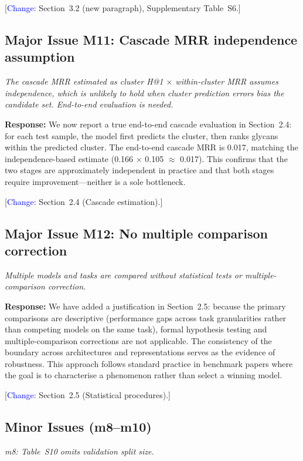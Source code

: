 \documentclass[11pt,a4paper]{article}
\newcommand{\reviewercomment}[1]{\textit{\color{black!70}#1}}
\newcommand{\response}[1]{\textbf{Response:} #1}
\newcommand{\change}[1]{[\textcolor{blue}{Change:} #1]}
\begin{document}
\change{Section~3.2 (new paragraph), Supplementary Table~S6.}

\subsection*{Major Issue M11: Cascade MRR independence assumption}

\reviewercomment{The cascade MRR estimated as cluster H@1 $\times$
within-cluster MRR assumes independence, which is unlikely to hold when cluster
prediction errors bias the candidate set. End-to-end evaluation is needed.}

\response{We now report a true end-to-end cascade evaluation in Section~2.4:
for each test sample, the model first predicts the cluster, then ranks glycans
within the predicted cluster. The end-to-end cascade MRR is 0.017, matching the
independence-based estimate (0.166 $\times$ 0.105 $\approx$ 0.017). This
confirms that the two stages are approximately independent in practice and that
both stages require improvement---neither is a sole bottleneck.}

\change{Section~2.4 (Cascade estimation).}

\subsection*{Major Issue M12: No multiple comparison correction}

\reviewercomment{Multiple models and tasks are compared without statistical
tests or multiple-comparison correction.}

\response{We have added a justification in Section~2.5: because the primary
comparisons are descriptive (performance gaps across task granularities rather
than competing models on the same task), formal hypothesis testing and
multiple-comparison corrections are not applicable. The consistency of the
boundary across architectures and representations serves as the evidence of
robustness. This approach follows standard practice in benchmark papers where
the goal is to characterise a phenomenon rather than select a winning model.}

\change{Section~2.5 (Statistical procedures).}

\subsection*{Minor Issues (m8--m10)}

\reviewercomment{m8: Table~S10 omits validation split size.}
\end{document}
